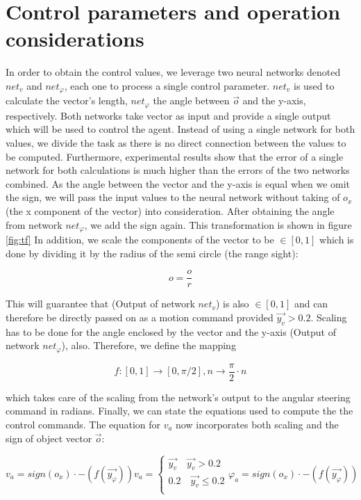 \documentclass[10pt,a4paper,DIV=11]{scrreprt}
\begin{document}
\section{Control parameters and operation considerations}
In order to obtain the control values, we leverage two neural networks denoted $net_v$ and $net_{\varphi}$, each one to process a single control parameter. 
$net_v$ is used to calculate the vector's length, $net_{\varphi}$ the angle between $\overrightarrow{o}$ and the y-axis, respectively.
Both networks take 
vector  as input and provide a single output which will be used to control the agent. Instead of using a single network
for both values, we divide the task as there is no direct connection between the values to be computed. Furthermore, experimental results show that
the error of a single network for both calculations is much higher than the errors of the two networks combined. As the angle between
the vector and the y-axis is equal when we omit the sign, we will pass the input values to the neural network without taking of $o_x$ (the x component
of the vector) into consideration. After obtaining the angle from network $net_{\varphi}$, we add the sign again. This transformation is shown in figure \ref{fig:tf}
In addition, we scale the components of the vector to be $\in [0,1]$ which is done by dividing it by the radius of the semi circle (the range sight):

\begin{equation}
    o = \frac{o}{r}
\end{equation}

This will guarantee that  (Output of network $net_v$) is also $\in [0,1]$ and can therefore
be directly passed on as a motion command provided $\overrightarrow{y_v} > 0.2$. Scaling has to be done for the angle enclosed by the vector and the y-axis 
 (Output of network $net_{\varphi}$), also. Therefore, we define the mapping

\begin{equation}
    f: [0,1] \rightarrow [0,\pi/2], n \rightarrow \frac{\pi}{2} \cdot n
\end{equation}

which takes care of the scaling from the network's output to the angular steering command in radians. Finally, we can state the equations used to
compute the the control commands. The equation for $v_a$ now incorporates both scaling and the sign of object vector $\overrightarrow{o}$:

\begin{equation}
\end{equation}
\begin{equation}

    v_a = sign(o_x) \cdot -(f(\overrightarrow{y_{\varphi}}))
	v_a=\begin{cases}
		\overrightarrow{y_v} \quad \overrightarrow{y_v} > 0.2 \\
		0.2 \quad \overrightarrow{y_v} \leq 0.2 \\
	\end{cases}
    \varphi_a = sign(o_x) \cdot -(f(\overrightarrow{y_{\varphi}}))
\label{eq:step}
\end{equation}
\end{document}

